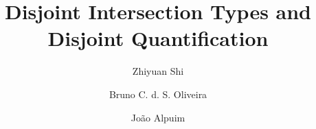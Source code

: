 \documentclass[9pt]{llncs}
\begin{document}

\title{Disjoint Intersection Types and Disjoint Quantification}

\author{Zhiyuan Shi \and Bruno C. d. S. Oliveira \and João Alpuim}


\maketitle

\begin{abstract}
  
\end{abstract}










\newpage



\clearpage
\onecolumn

%
%
\end{document}

